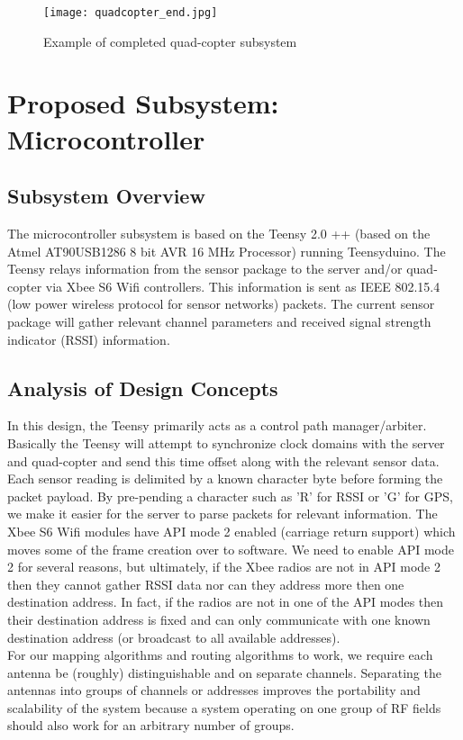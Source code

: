 \documentclass[11pt,letterpaper,titlepage]{article}
\begin{document}
\begin{onehalfspace}
\begin{wrapfigure}{r}{0.55\textwidth}

\centering
\texttt{[image: quadcopter\_end.jpg]}
\caption{Example of completed quad-copter subsystem}
\end{wrapfigure}
 
 
\section{Proposed Subsystem: Microcontroller}
\subsection{Subsystem Overview}
The microcontroller subsystem is based on the Teensy 2.0 ++ (based on the Atmel AT90USB1286 8 bit AVR 16 MHz Processor) running Teensyduino. The Teensy relays information from the sensor package to the server and/or quad-copter via Xbee S6 Wifi controllers. This information is sent as IEEE 802.15.4 (low power wireless protocol for sensor networks) packets. The current sensor package will gather relevant channel parameters and received signal strength indicator (RSSI) information. 
\subsection{Analysis of Design Concepts}
In this design, the Teensy primarily acts as a control path manager/arbiter. Basically the Teensy will attempt to synchronize clock domains with the server and quad-copter and send this time offset along with the relevant sensor data. Each sensor reading is delimited by a known character byte before forming the packet payload. By pre-pending a character such as 'R' for RSSI or 'G' for GPS, we make it easier for the server to parse packets for relevant information. The Xbee S6 Wifi modules have API mode 2 enabled (carriage return support) which moves some of the frame creation over to software. We need to enable API mode 2 for several reasons, but ultimately, if the Xbee radios are not in API mode 2 then they cannot gather RSSI data nor can they address more then one destination address. In fact, if the radios are not in one of the API modes then their destination address is fixed and can only communicate with one known destination address (or broadcast to all available addresses).\\ 

\noindent
For our mapping algorithms and routing algorithms to work, we require each antenna be (roughly) distinguishable and on separate channels. Separating the antennas into groups of channels or addresses improves the portability and scalability of the system because a system operating on one group of RF fields should also work for an arbitrary number of groups.   


\end{onehalfspace}
\end{document}
